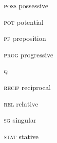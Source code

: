\begin{multicols}{2}
\textsc{poss} \hfill  possessive  \

\textsc{pot} \hfill  potential \

\textsc{pp} \hfill   preposition \

\textsc{prog} \hfill  progressive  \

\textsc{q}  \hfill  {}  \

\textsc{recip}  \hfill  reciprocal  \

\textsc{rel} \hfill   relative  \

\textsc{sg} \hfill   singular  \

\textsc{stat} \hfill   stative  \


\end{multicols}
 
 
